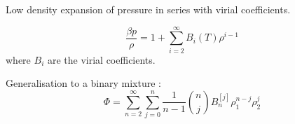 Low density expansion of pressure in series with virial coefficients.

\begin{equation}
  \frac{\beta p}{\rho} =
  1 + \sum_{i=2}^\infty B_i(T) \rho^{i-1}
\end{equation}
where $B_i$ are the virial coefficients.

Generalisation to a binary mixture : \cite{Hansen-GoosJCP2014}
\begin{equation}\label{eq:virial-series-binary}
  \Phi = \sum_{n=2}^\infty \sum_{j=0}^{n}
  \frac{1}{n-1} {n \choose j} B_n^{[j]} \rho_1^{n-j} \rho_2^j
\end{equation}
